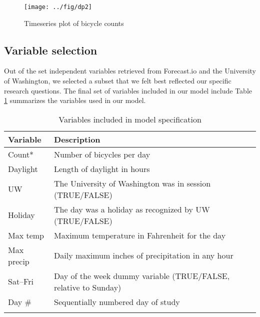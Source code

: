 \documentclass[12pt,letterpaper,article,twocolumn]{memoir}
\begin{document}
\begin{figure}[h!]
  \centering
  \texttt{[image: ../fig/dp2]}
  \caption{Timeseries plot of bicycle counts}
  \label{fg:timeseries}
\end{figure}

\FloatBarrier
\subsection*{Variable selection}
% 
% 

Out of the set independent variables retrieved from Forecast.io and
the University of Washington, we selected a subset that we felt best
reflected our specific research questions. The final set of variables
included in our model include Table \ref{tb:variables} summarizes the
variables used in our model.

\begin{centering}
\begin{table}[ht!]
\begin{scriptsize}
\caption{Variables included in model specification}
\begin{tabularx}{0.47\textwidth}{>{\raggedright\arraybackslash}p{1.6cm}>{\raggedright\arraybackslash}X}
\toprule
Variable & Description \\
\midrule
Count* & Number of bicycles per day \\
Daylight  & Length of daylight in hours \\
UW & The University of Washington was in session (TRUE/FALSE) \\
Holiday & The day was a holiday as recognized by UW (TRUE/FALSE) \\
Max temp & Maximum temperature in Fahrenheit for the day \\
Max precip & Daily maximum inches of precipitation in any hour \\
Sat--Fri & Day of the week dummy variable (TRUE/FALSE, relative to Sunday) \\
Day \# & Sequentially numbered day of study \\
\bottomrule
\multicolumn{2}{r}{* Dependent variable}
\end{tabularx}

\label{tb:variables}
\end{scriptsize}
\end{table}
\end{centering}
\end{document}
